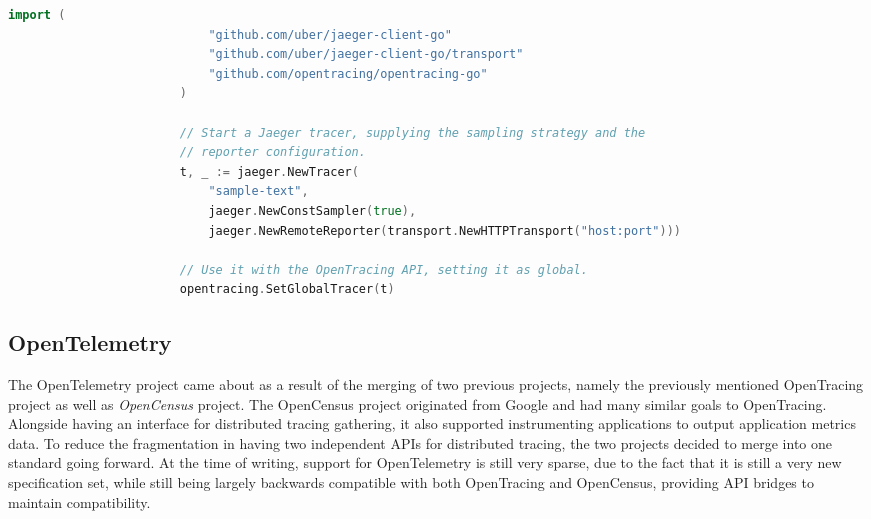 \documentclass[12pt,pdftex,titlepage]{report}
\begin{document}
                \medskip
                \begin{spacing}{1.0}
                    \begin{lstlisting}[caption={[Example Go snippet of instatiating a Jaeger tracer]Example Go snippet of instatiating a Jaeger OpenTracing compatible tracer.}, language=Go, gobble=24, label={lst:jaegertrace}]
                        import (
                            "github.com/uber/jaeger-client-go"
                            "github.com/uber/jaeger-client-go/transport"
                            "github.com/opentracing/opentracing-go"
                        )

                        // Start a Jaeger tracer, supplying the sampling strategy and the
                        // reporter configuration.
                        t, _ := jaeger.NewTracer(
                            "sample-text",
                            jaeger.NewConstSampler(true),
                            jaeger.NewRemoteReporter(transport.NewHTTPTransport("host:port")))

                        // Use it with the OpenTracing API, setting it as global.
                        opentracing.SetGlobalTracer(t)
                    \end{lstlisting}
                \end{spacing}

            \subsection{OpenTelemetry}
            \label{sec:opentele}
                The OpenTelemetry\cite{opentelemetry} project came about as a result of the merging of two previous projects, namely the previously mentioned OpenTracing
                project as well as \textit{OpenCensus} project. The OpenCensus project originated from Google and had many similar goals to OpenTracing. Alongside having an interface
                for distributed tracing gathering, it also supported instrumenting applications to output application metrics data. To reduce the fragmentation in having
                two independent APIs for distributed tracing, the two projects decided to merge into one standard going forward. At the time of writing, support for OpenTelemetry
                is still very sparse, due to the fact that it is still a very new specification set, while still being largely backwards compatible with both OpenTracing and 
                OpenCensus, providing API bridges to maintain compatibility. 
\end{document}
